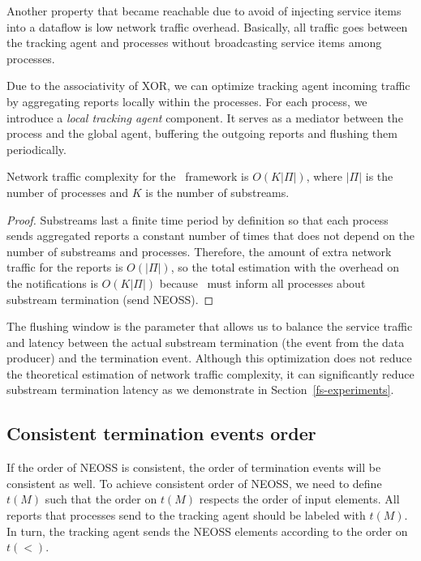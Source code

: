 Another property that became reachable due to avoid of injecting service items into a dataflow is low network traffic overhead. Basically, all traffic goes between the tracking agent and processes without broadcasting service items among processes.

Due to the associativity of XOR, we can optimize tracking agent incoming traffic by aggregating reports locally within the processes. For each process, we introduce a {\em local tracking agent} component. It serves as a mediator between the process and the global agent, buffering the outgoing reports and flushing them periodically. 

\begin{lemma}
Network traffic complexity for the \tracker\ framework is $O(K|\Pi|)$, where $|\Pi|$ is the number of processes and $K$ is the number of substreams.
\end{lemma}
\begin{proof}
Substreams last a finite time period by definition so that each process sends aggregated reports a constant number of times that does not depend on the number of substreams and processes. Therefore, the amount of extra network traffic for the reports is $O(|\Pi|)$, so the total estimation with the overhead on the notifications is $O(K|\Pi|)$ because \tracker\ must inform all processes about substream termination (send NEOSS).
\end{proof}

The flushing window is the parameter that allows us to balance the service traffic and latency between the actual substream termination (the event from the data producer) and the termination event. Although this optimization does not reduce the theoretical estimation of network traffic complexity, it can significantly reduce substream termination latency as we demonstrate in Section~\ref{fs-experiments}.

\subsection{Consistent termination events order}
\label{termination_order_impl}

If the order of NEOSS is consistent, the order of termination events will be consistent as well. To achieve consistent order of NEOSS, we need to define $t(M)$ such that the order on $t(M)$ respects the order of input elements. All reports that processes send to the tracking agent should be labeled with $t(M)$. In turn, the tracking agent sends the NEOSS elements according to the order on $t(<)$.

